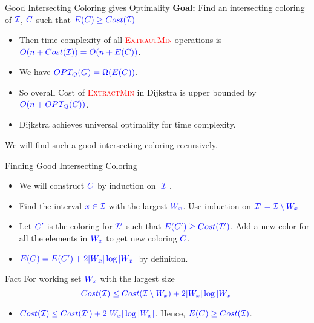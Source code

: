 \documentclass[10pt]{beamer}
\begin{document}
\begin{frame}{Good Intersecting Coloring gives Optimality}
	\textbf{Goal:} Find an intersecting coloring of $\mathcolor{blue}{\mathcal{I}}$, $\mathcolor{blue}{C}$ such that $\mathcolor{blue}{E(C)\geq Cost(\mathcal{I})}$\pause

	\begin{itemize}
		\item Then time complexity of all \textcolor{red}{\textsc{ExtractMin}} operations is $\mathcolor{blue}{O(n+Cost(\mathcal{I}))=O(n+E(C))}$.\pause
		\item We have  $\mathcolor{blue}{OPT_Q(G)=\Omega (E(C))}$.\pause
		\item So overall Cost of \textcolor{red}{\textsc{ExtractMin}} in Dijkstra is upper bounded by $\mathcolor{blue}{O(n+OPT_Q(G))}$.\pause
		\item Dijkstra achieves universal optimality for time complexity.\pause
	\end{itemize}
	\vfill

	We will find such a good intersecting coloring recursively.
\end{frame}
\begin{frame}{Finding Good Intersecting Coloring}
	\begin{itemize}
		\item We will construct $\mathcolor{blue}{C}$ by induction on $\mathcolor{blue}{|\mathcal{I}|}$.\pause
		\item Find the interval $\mathcolor{blue}{x\in\mathcal{I}}$ with the largest $\mathcolor{blue}{W_x}$. Use induction on $\mathcolor{blue}{\mathcal{I}'=\mathcal{I}\setminus W_x}$\pause
		\item Let $\mathcolor{blue}{C'}$ is the coloring for $\mathcolor{blue}{\mathcal{I}'}$ such that $\mathcolor{blue}{E(C')\geq Cost(\mathcal{I}')}$. Add a new color for all the elements in $\mathcolor{blue}{W_x}$ to get new coloring $\mathcolor{blue}{C}$.\pause
		\item $\mathcolor{blue}{E(C)=E(C')+2|W_x|\log|W_x|}$ by definition. \pause
	\end{itemize}







	\begin{alertblock}{Fact}
		For working set $\mathcolor{blue}{W_x}$ with the largest size $$\mathcolor{blue}{Cost(\mathcal{I})\leq Cost(\mathcal{I}\setminus W_x)+2|W_x|\log |W_x|}$$
	\end{alertblock}\pause
	\begin{itemize}
		\item $\mathcolor{blue}{Cost(\mathcal{I})\leq Cost(\mathcal{I}')+2|W_x|\log|W_x|}$. Hence, $\mathcolor{blue}{E(C)\geq Cost(\mathcal{I})}$.
	\end{itemize}

\end{frame}
\end{document}
